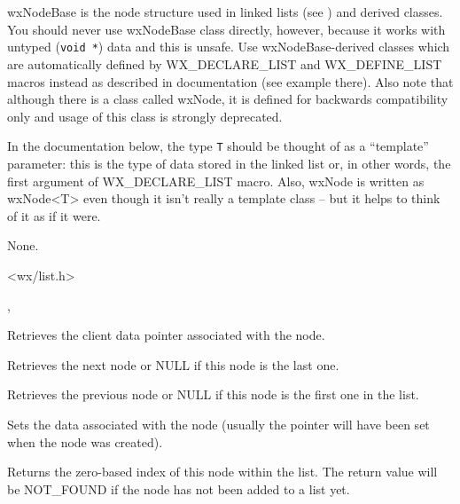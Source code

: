 \section{}\label{wxnode}

wxNodeBase is the node structure used in linked lists (see 
) and derived classes. You should never use wxNodeBase
class directly, however, because it works with untyped ({\tt void *}) data and
this is unsafe. Use wxNodeBase-derived classes which are automatically defined
by WX\_DECLARE\_LIST and WX\_DEFINE\_LIST macros instead as described in
 documentation (see example there). Also note that
although there is a class called wxNode, it is defined for backwards
compatibility only and usage of this class is strongly deprecated.

In the documentation below, the type {\tt T} should be thought of as a
``template'' parameter: this is the type of data stored in the linked list or,
in other words, the first argument of WX\_DECLARE\_LIST macro. Also, wxNode is
written as wxNode<T> even though it isn't really a template class -- but it
helps to think of it as if it were.


None.


<wx/list.h>


, 


\label{wxnodegetdata}


Retrieves the client data pointer associated with the node.

\label{wxnodegetnext}


Retrieves the next node or NULL if this node is the last one.

\label{wxnodegetprevious}


Retrieves the previous node or NULL if this node is the first one in the list.

\label{wxnodesetdata}


Sets the data associated with the node (usually the pointer will have been
set when the node was created).

\label{wxnodeindexof}


Returns the zero-based index of this node within the list. The return value
will be NOT\_FOUND if the node has not been added to a list yet.

